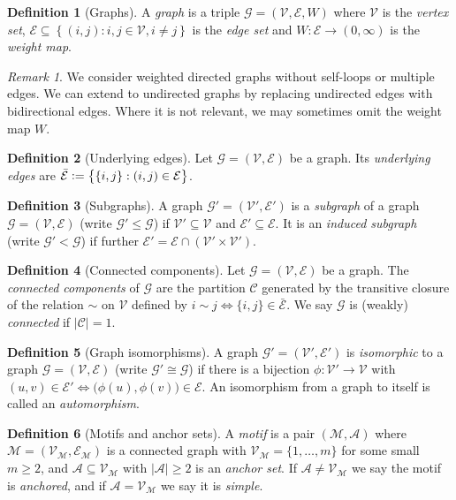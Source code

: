 \documentclass[12pt]{ociamthesis}
\theoremstyle{plain}
\theoremstyle{definition}
\newtheorem{definition}{Definition}[chapter]
\theoremstyle{remark}
\newtheorem*{remark}{Remark}
\newcommand\ca[1]{\mathcal{#1}}
\begin{document}
\begin{definition}[Graphs]
A \emph{graph} is a triple $\ca{G} = (\ca{V,E},W)$ where $\ca{V}$ is the
\emph{vertex set}, $\ca{E} \subseteq \left\{ (i,j) : i,j \in \ca{V}, i \neq j
\right\}$ is the \emph{edge set} and $W\colon \ca{E} \to (0,\infty)$ is the
\emph{weight map}.
\end{definition}

\begin{remark}
We consider weighted directed graphs without self-loops or multiple edges. We
can extend to undirected graphs by replacing undirected edges with
bidirectional edges. Where it is not relevant, we may sometimes omit the
weight map $W$.
\end{remark}

\begin{definition}[Underlying edges]
Let $\ca{G} = (\ca{V,E})$ be a graph. Its \emph{underlying edges} are
$\bar{\ca{E}} \vcentcolon = \big\{ \{i,j\} : (i,j) \in \ca{E} \big\}$.
\end{definition}

\begin{definition}[Subgraphs]
A graph $\ca{G'} = (\ca{V',E'})$ is a \emph{subgraph} of a graph $\ca{G} =
(\ca{V,E})$ (write $\ca{G'} \leq \ca{G}$) if $\ca{V'} \subseteq \ca{V}$ and
$\ca{E'} \subseteq \ca{E}$. It is an \emph{induced subgraph} (write $\ca{G'}
< \ca{G}$) if further $\ca{E'} = \ca{E} \cap ( \ca{V'} \times \ca{V'} )$.
\end{definition}

\begin{definition}[Connected components]
Let $\ca{G} = (\ca{V,E})$ be a graph. The \emph{connected components} of
$\ca{G}$ are the partition $\ca{C}$ generated by the transitive closure of
the relation $\sim$ on $\ca{V}$ defined by $i \sim j \iff \{i,j\} \in
\bar{\ca{E}}$. We say $\ca{G}$ is (weakly) \emph{connected} if $|\ca{C}| =
1$.
\end{definition}

\begin{definition}[Graph isomorphisms]
A graph $\ca{G'} = (\ca{V',E'})$ is \emph{isomorphic} to a graph $\ca{G} =
(\ca{V,E})$ (write $\ca{G'} \cong \ca{G}$) if there is a bijection
$\phi\colon \ca{V'} \rightarrow \ca{V}$ with $(u,v) \in \ca{E'} \iff
\big(\phi(u), \phi(v) \big) \in \ca{E}$.
An isomorphism from a graph to itself is called an \emph{automorphism}.
\end{definition}

\begin{definition}[Motifs and anchor sets]
A \emph{motif} is a pair $(\ca{M,A})$ where $\ca{M} = (\ca{V_M,E_M})$ is a
connected graph with $\ca{V_M} = \{ 1, \ldots, m \}$ for some small $m \geq
2$, and $\ca{A} \subseteq \ca{V_M}$ with $|\ca{A}| \geq 2$ is an \emph{anchor
set}. If $\ca{A} \neq \ca{V_M}$ we say the motif is \emph{anchored}, and if
$\ca{A=V_M}$ we say it is \emph{simple}.
\end{definition}
\end{document}

